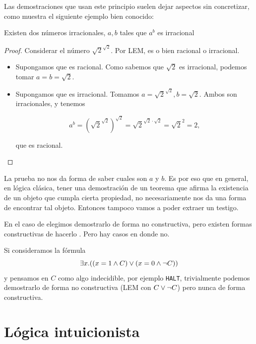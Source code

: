 Las demostraciones que usan este principio suelen dejar aspectos sin
concretizar, como muestra el siguiente ejemplo bien conocido:

\begin{theorem}\label{fri:thm:irrat}
    Existen dos números irracionales, $a, b$ tales que $a^b$ es irracional
\end{theorem}
\begin{proof}
    Considerar el número $\sqrt{2}^{\sqrt{2}}$. Por LEM, es o bien racional o
    irracional.
    \begin{itemize}
        \item Supongamos que es racional. Como sabemos que $\sqrt{2}$ es
        irracional, podemos tomar $a=b=\sqrt{2}$.
        \item Supongamos que es irracional. Tomamos $a = \sqrt{2}^{\sqrt{2}}, b
        = \sqrt{2}$. Ambos son irracionales, y tenemos

        \[
            a^b
            = \left( \sqrt{2}^{\sqrt{2}} \right)^{\sqrt{2}}
            = \sqrt{2}^{\sqrt{2} \cdot \sqrt{2}}
            = \sqrt{2}^{2}
            = 2,
        \]

        que es racional.
    \end{itemize}
\end{proof}

La prueba no nos da forma de saber cuales son $a$ y $b$. Es por eso que en
general, en lógica clásica, tener una demostración de un teorema que afirma la
existencia de un objeto que cumpla cierta propiedad, no necesariamente nos da
una forma de encontrar tal objeto. Entonces tampoco vamos a poder extraer un
testigo.

En el caso de  elegimos demostrarlo de forma no
constructiva, pero existen formas constructivas de hacerlo . Pero hay casos en donde no.

\begin{ejemplo}
    Si consideramos la fórmula
    \[
        \exists x . ((x = 1 \wedge C) \vee (x = 0 \wedge \neg C))
    \]
    y pensamos en $C$ como algo indecidible, por ejemplo \texttt{HALT},
    trivialmente podemos demostrarlo de forma no constructiva (LEM con $C \vee
    \neg C$) pero nunca de forma constructiva.
\end{ejemplo}

\section{Lógica intuicionista}

